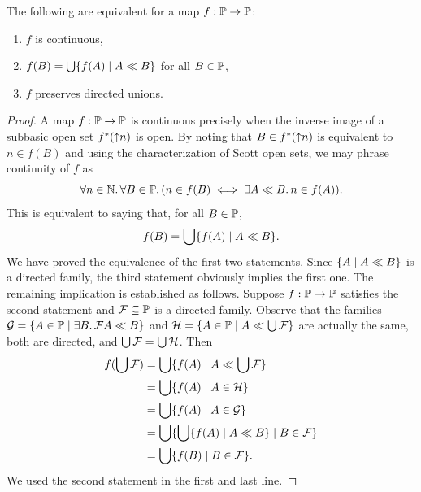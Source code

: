 \begin{proposition}
  The following are equivalent for a map $f : \mathbb{P} \to \mathbb{P}$:
  \begin{enumerate}
  \item $f$ is continuous,
  \item $f(B) = \bigcup\nolimits \{f(A) \mid A \ll B\}$ for all $B \in \mathbb{P}$,
  \item $f$ preserves directed unions.
  \end{enumerate}
\end{proposition}

\begin{proof}
  A map $f : \mathbb{P} \to \mathbb{P}$ is continuous precisely when the
  inverse image of a subbasic open set $f^{*}({\uparrow}n)$ is open.
  By noting that $B \in f^{*}({\uparrow}n)$ is equivalent to $n \in
  f(B)$ and using the characterization of Scott open sets, we may
  phrase continuity of $f$ as
  \begin{equation*}
    \forall n \in \mathbb{N} .\,{
      \forall B \in \mathbb{P} .\,
        (n \in f(B) \iff \exists A \ll B .\, n \in f(A))
    }.
  \end{equation*}
  This is equivalent to saying that, for all $B \in \mathbb{P}$,
  \begin{equation*}
    f(B) = \bigcup\nolimits \{f(A) \mid A \ll B\}.
  \end{equation*}
  We have proved the equivalence of the first two statements. Since
  $\{A \mid A \ll B\}$ is a directed family, the third statement
  obviously implies the first one. The remaining implication is
  established as follows. Suppose $f : \mathbb{P} \to \mathbb{P}$ satisfies
  the second statement and $\mathcal{F} \subseteq \mathbb{P}$ is a
  directed family. Observe that the families $\mathcal{G} = \{A \in
    \mathbb{P} \mid \exists B .\,{\mathcal{F}}{A \ll B}\}$ and $\mathcal{H}
  = \{A \in \mathbb{P} \mid A \ll \bigcup\nolimits \mathcal{F}\}$ are
  actually the same, both are directed, and $\bigcup\nolimits \mathcal{F} =
  \bigcup\nolimits \mathcal{H}$. Then
  \begin{align*}
    f (\bigcup\nolimits \mathcal{F}) &=
    \bigcup\nolimits \{f(A) \mid A \ll \bigcup\nolimits \mathcal{F}\} \\
    &= \bigcup\nolimits \{f(A) \mid A \in \mathcal{H}\} \\
    &= \bigcup\nolimits \{f(A) \mid A \in \mathcal{G}\} \\
    &= \bigcup\nolimits \{\bigcup\nolimits \{f(A) \mid A \ll B\} \mid B \in \mathcal{F}\} \\
    &= \bigcup\nolimits \{f(B) \mid B \in \mathcal{F}\}.
  \end{align*}
  We used the second statement in the first and last line.
\end{proof}

